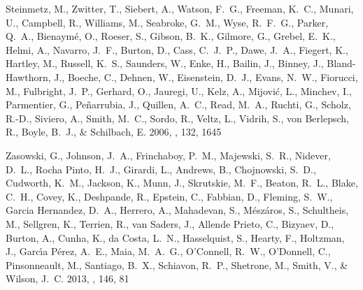 \documentclass[12pt, preprint]{aastex}
\begin{document}
\begin{thebibliography}{24}
{Steinmetz}, M., {Zwitter}, T., {Siebert}, A., {Watson}, F.~G., {Freeman},
  K.~C., {Munari}, U., {Campbell}, R., {Williams}, M., {Seabroke}, G.~M.,
  {Wyse}, R.~F.~G., {Parker}, Q.~A., {Bienaym{\'e}}, O., {Roeser}, S.,
  {Gibson}, B.~K., {Gilmore}, G., {Grebel}, E.~K., {Helmi}, A., {Navarro},
  J.~F., {Burton}, D., {Cass}, C.~J.~P., {Dawe}, J.~A., {Fiegert}, K.,
  {Hartley}, M., {Russell}, K.~S., {Saunders}, W., {Enke}, H., {Bailin}, J.,
  {Binney}, J., {Bland-Hawthorn}, J., {Boeche}, C., {Dehnen}, W., {Eisenstein},
  D.~J., {Evans}, N.~W., {Fiorucci}, M., {Fulbright}, J.~P., {Gerhard}, O.,
  {Jauregi}, U., {Kelz}, A., {Mijovi{\'c}}, L., {Minchev}, I., {Parmentier},
  G., {Pe{\~n}arrubia}, J., {Quillen}, A.~C., {Read}, M.~A., {Ruchti}, G.,
  {Scholz}, R.-D., {Siviero}, A., {Smith}, M.~C., {Sordo}, R., {Veltz}, L.,
  {Vidrih}, S., {von Berlepsch}, R., {Boyle}, B.~J., \& {Schilbach}, E. 2006,
  \aj, 132, 1645

{Zasowski}, G., {Johnson}, J.~A., {Frinchaboy}, P.~M., {Majewski}, S.~R.,
  {Nidever}, D.~L., {Rocha Pinto}, H.~J., {Girardi}, L., {Andrews}, B.,
  {Chojnowski}, S.~D., {Cudworth}, K.~M., {Jackson}, K., {Munn}, J.,
  {Skrutskie}, M.~F., {Beaton}, R.~L., {Blake}, C.~H., {Covey}, K.,
  {Deshpande}, R., {Epstein}, C., {Fabbian}, D., {Fleming}, S.~W., {Garcia
  Hernandez}, D.~A., {Herrero}, A., {Mahadevan}, S., {M{\'e}sz{\'a}ros}, S.,
  {Schultheis}, M., {Sellgren}, K., {Terrien}, R., {van Saders}, J., {Allende
  Prieto}, C., {Bizyaev}, D., {Burton}, A., {Cunha}, K., {da Costa}, L.~N.,
  {Hasselquist}, S., {Hearty}, F., {Holtzman}, J., {Garc{\'{\i}}a P{\'e}rez},
  A.~E., {Maia}, M.~A.~G., {O'Connell}, R.~W., {O'Donnell}, C., {Pinsonneault},
  M., {Santiago}, B.~X., {Schiavon}, R.~P., {Shetrone}, M., {Smith}, V., \&
  {Wilson}, J.~C. 2013, \aj, 146, 81

\end{thebibliography}
\end{document}
